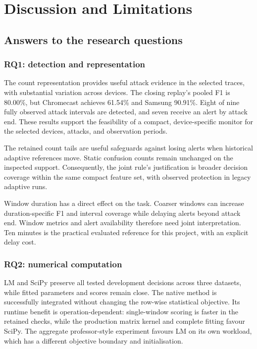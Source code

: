 \chapter{Discussion and Limitations}
\label{ch:discussion}
\section{Answers to the research questions}
\label{sec:rq-answers}

\subsection{RQ1: detection and representation}

The count representation provides useful attack evidence in the selected
traces, with substantial variation across devices. The closing replay's
pooled F1 is 80.00\%, but Chromecast achieves 61.54\% and Samsung
90.91\%. Eight of nine fully observed attack intervals are detected,
and seven receive an alert by attack end. These results support the
feasibility of a compact, device-specific monitor for the selected devices,
attacks, and observation periods.

The retained count tails are useful safeguards against losing alerts
when historical adaptive references move. Static confusion counts remain
unchanged on the inspected support. Consequently, the
joint rule's justification is broader decision coverage within the
same compact feature set, with observed protection in legacy adaptive runs.

Window duration has a direct effect on the task. Coarser windows can
increase duration-specific F1 and interval coverage while delaying
alerts beyond attack end. Window metrics and alert availability therefore
need joint interpretation. Ten minutes is the practical evaluated reference
for this project, with an explicit delay cost.

\subsection{RQ2: numerical computation}

LM and SciPy preserve all tested development decisions across three
datasets, while fitted parameters and scores remain close. The native
method is successfully integrated without changing the row-wise
statistical objective. Its runtime benefit is operation-dependent:
single-window scoring is faster in the retained checks, while the
production matrix kernel and complete fitting favour SciPy. The
aggregate professor-style experiment favours LM on its own workload,
which has a different objective boundary and initialisation.

